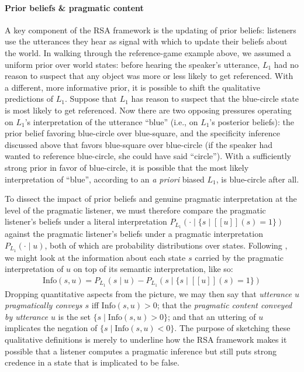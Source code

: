 \documentclass[10pt,letterpaper]{article}
\newcommand{\sem}[1]{\ensuremath{[\![#1]\!]}}
\begin{document}
\paragraph{Prior beliefs \& pragmatic content}
A key component of the RSA framework is the updating of prior beliefs: listeners use the utterances they hear as signal with which to update their beliefs about the world.
In walking through the reference-game example above, we assumed a uniform prior over world states: before hearing the speaker's utterance, $L_1$ had no reason to suspect that any object was more or less likely to get referenced.
With a different, more informative prior, it is possible to shift the qualitative predictions of $L_1$.
Suppose that $L_1$ has reason to suspect that the blue-circle state is most likely to get referenced.
Now there are two opposing pressures operating on $L_1$'s interpretation of the utterance ``blue'' (i.e., on $L_1$'s posterior beliefs): the prior belief favoring blue-circle over blue-square, and the specificity inference discussed above that favors blue-square over blue-circle (if the speaker had wanted to reference blue-circle, she could have said ``circle'').
With a sufficiently strong prior in favor of blue-circle, it is possible that the most likely interpretation of ``blue'', according to an \emph{a priori} biased $L_1$, is blue-circle after all.

To dissect the impact of prior beliefs and genuine pragmatic interpretation at the level of the pragmatic listener, we must therefore compare the pragmatic listener's beliefs under a literal interpretation $P_{L_{1}}(\cdot \mid \{s
\mid \sem {u}(s)=1\})$ against the pragmatic listener's beliefs under a pragmatic interpretation $P_{L_{1}}(\cdot \mid u)$, both of which are probability distributions over states.
Following \cite{Skyrms2010:Signals}, we might look at the information about each state $s$ carried by the pragmatic interpretation of $u$ on top of its semantic interpretation, like so:
\begin{align*}
  \text{Info}(s, u) = { P_{L_{1}}(s \mid u) }
  -
  { P_{L_{1}}(s \mid \{s \mid \sem{u}(s)=1\}) }
\end{align*}
Dropping quantitative aspects from the picture, we may then say that \emph{utterance $u$ pragmatically conveys $s$} iff $\text{Info}(s,u) > 0$; that the \emph{pragmatic content conveyed by utterance $u$} is the set $\{s \mid \text{Info}(s,u) > 0\}$; and that an uttering of $u$ implicates the negation of $\{s \mid \text{Info}(s,u) < 0\}$.
The purpose of sketching these qualitative definitions is merely to underline how the RSA framework makes it possible that a listener computes a pragmatic inference but still puts strong credence in a state that is implicated to be false.
\end{document}
